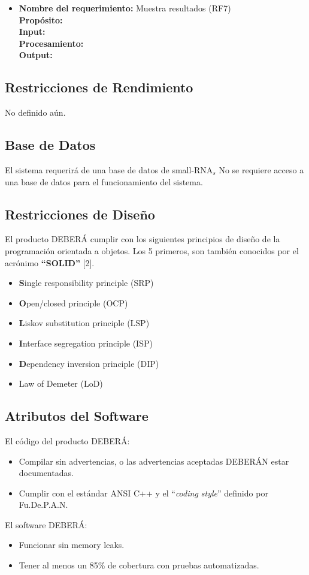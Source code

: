 \documentclass[12pt,a4paper,english,spanish]{article}
\begin{document}
\begin{itemize}
		\item \textbf{Nombre del requerimiento:} Muestra resultados (RF7)\\
			  \textbf{Propósito:} \\
			  \textbf{Input:} \\
			  \textbf{Procesamiento:} \\
			  \textbf{Output:} \\
	\end{itemize}


\subsection{Restricciones de Rendimiento}
	 No definido aún.

\subsection{Base de Datos}
El sistema requerirá de una base de datos de small-RNA$_s$
	No se requiere acceso a una base de datos para el funcionamiento del sistema.

\subsection{Restricciones de Diseño}
\par El producto DEBERÁ cumplir con los siguientes principios de diseño de la
programación orientada a objetos. Los 5 primeros, son también conocidos por
el acrónimo \textbf{``SOLID''} [2].
\begin{itemize}
	\item \textbf{S}ingle responsibility principle (SRP)
	\item \textbf{O}pen/closed principle (OCP)
	\item \textbf{L}iskov substitution principle (LSP)
	\item \textbf{I}nterface segregation principle (ISP)
	\item \textbf{D}ependency inversion principle (DIP)	
	\item Law of Demeter (LoD)
\end{itemize}

\subsection{Atributos del Software}
\par El código del producto DEBERÁ:
\begin{itemize}
 \item Compilar sin advertencias, o las advertencias aceptadas DEBERÁN estar documentadas.
 \item Cumplir con el estándar ANSI C++ y el ``\textit{coding style}'' definido por Fu.De.P.A.N.
\end{itemize}
\par El software DEBERÁ:
\begin{itemize}
	\item Funcionar sin memory leaks.
	\item Tener al menos un 85\% de cobertura con pruebas automatizadas.
\end{itemize}
\end{document}

